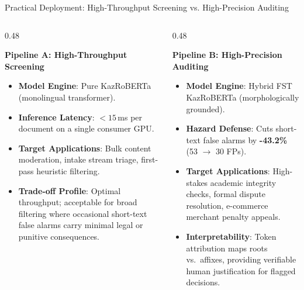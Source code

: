 \documentclass[aspectratio=169, 10pt]{beamer}
\newcommand{\subhead}[1]{{\normalsize\textbf{\color{DarkNavy}#1}\par\vspace{3pt}}}
\begin{document}
\begin{frame}{Practical Deployment: High-Throughput Screening vs. High-Precision Auditing}
    \begin{columns}[T]
        \begin{column}{0.48\textwidth}
            \subhead{Pipeline A: High-Throughput Screening}
            \vspace{4pt}
            \begin{itemize}\setlength{\itemsep}{5pt}\small
                \item \textbf{Model Engine}: Pure KazRoBERTa (monolingual transformer).
                \item \textbf{Inference Latency}: $< 15$\,ms per document on a single consumer GPU.
                \item \textbf{Target Applications}: Bulk content moderation, intake stream triage, first-pass heuristic filtering.
                \item \textbf{Trade-off Profile}: Optimal throughput; acceptable for broad filtering where occasional short-text false alarms carry minimal legal or punitive consequences.
            \end{itemize}
        \end{column}
        \begin{column}{0.48\textwidth}
            \subhead{Pipeline B: High-Precision Auditing}
            \vspace{4pt}
            \begin{itemize}\setlength{\itemsep}{5pt}\small
                \item \textbf{Model Engine}: Hybrid FST KazRoBERTa (morphologically grounded).
                \item \textbf{Hazard Defense}: Cuts short-text false alarms by \textbf{-43.2\%} (53 $\to$ 30 FPs).
                \item \textbf{Target Applications}: High-stakes academic integrity checks, formal dispute resolution, e-commerce merchant penalty appeals.
                \item \textbf{Interpretability}: Token attribution maps roots vs.\ affixes, providing verifiable human justification for flagged decisions.
            \end{itemize}
        \end{column}
    \end{columns}
\end{frame}
\end{document}
